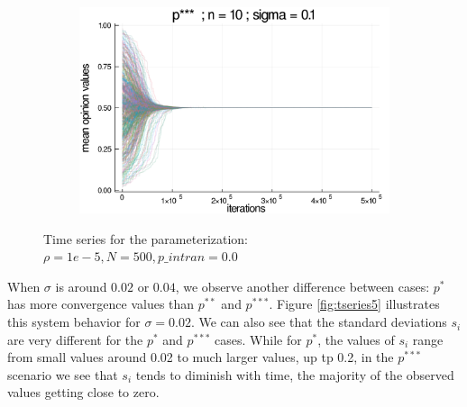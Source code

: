 \documentclass{article}
\begin{document}
\begin{figure}[H]
            \begin{subfigure}[b]{0.48\textwidth}
        \includegraphics[width=\textwidth]{img/series/tseries4/Poodlcalculatep***n10-rho10e-5-sigma01-00intransrandom.png}
      \end{subfigure}
      \caption{Time series for the parameterization: \(\rho = 1e-5, N =
        500, p\_intran = 0.0 \)}
      \label{fig:tseries4}
    \end{figure}
    
   When \(\sigma\) is around \(0.02\) or \(0.04\), we observe another difference
    between cases: \(p^{*}\) has more convergence values than \(p^{**}\) and
    \(p^{***}\). Figure \ref{fig:tseries5} illustrates this system behavior for $\sigma=0.02$. We can also see that the standard deviations $s_i$ are very different for the \(p^{*}\) and \(p^{***}\) cases. While for \(p^{*}\), the values of $s_i$ range from small values around 0.02 to much larger values, up tp 0.2, in the \(p^{***}\) scenario we see that $s_i$ tends to diminish with time, the majority of the observed values getting close to zero.
\end{document}
